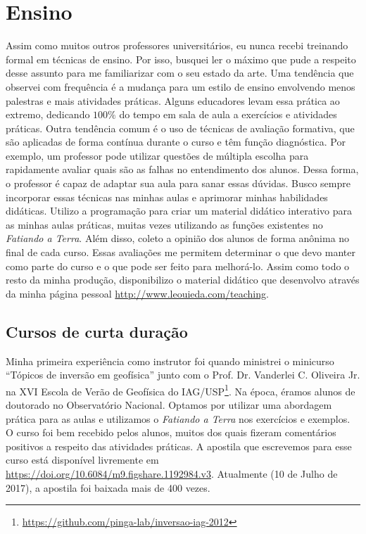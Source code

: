 \section{Ensino}

Assim como muitos outros professores universitários, eu nunca recebi treinando
formal em técnicas de ensino.
Por isso, busquei ler o máximo que pude a respeito desse assunto para me
familiarizar com o seu estado da arte.
Uma tendência que observei com frequência é a mudança para um estilo de ensino
envolvendo menos palestras e mais atividades práticas.
Alguns educadores levam essa prática ao extremo, dedicando $100\%$ do tempo em
sala de aula a exercícios e atividades práticas.
Outra tendência comum é o uso de técnicas de avaliação formativa, que são
aplicadas de forma contínua durante o curso e têm função diagnóstica.
Por exemplo, um professor pode utilizar questões de múltipla escolha para
rapidamente avaliar quais são as falhas no entendimento dos alunos.
Dessa forma, o professor é capaz de adaptar sua aula para sanar essas dúvidas.
Busco sempre incorporar essas técnicas nas minhas aulas e aprimorar minhas
habilidades didáticas.
Utilizo a programação para criar um material didático interativo para as minhas
aulas práticas, muitas vezes utilizando as funções existentes no
\textit{Fatiando a Terra}.
Além disso, coleto a opinião dos alunos de forma anônima no final de cada
curso.
Essas avaliações me permitem determinar o que devo manter como parte do curso e
o que pode ser feito para melhorá-lo.
Assim como todo o resto da minha produção, disponibilizo o material didático
que desenvolvo através da minha página pessoal
\url{http://www.leouieda.com/teaching}.


\subsection{Cursos de curta duração}

Minha primeira experiência como instrutor foi quando ministrei o minicurso
``Tópicos de inversão em geofísica'' junto com o Prof. Dr. Vanderlei C.
Oliveira Jr. na XVI Escola de Verão de Geofísica do
IAG/USP\footnote{\url{https://github.com/pinga-lab/inversao-iag-2012}}.
Na época, éramos alunos de doutorado no Observatório Nacional.
Optamos por utilizar uma abordagem prática para as aulas e utilizamos o
\textit{Fatiando a Terra} nos exercícios e exemplos.
O curso foi bem recebido pelos alunos, muitos dos quais fizeram comentários
positivos a respeito das atividades práticas.
A apostila que escrevemos para esse curso está disponível livremente em
\url{https://doi.org/10.6084/m9.figshare.1192984.v3}.
Atualmente (10 de Julho de 2017), a apostila foi baixada mais de 400 vezes.

